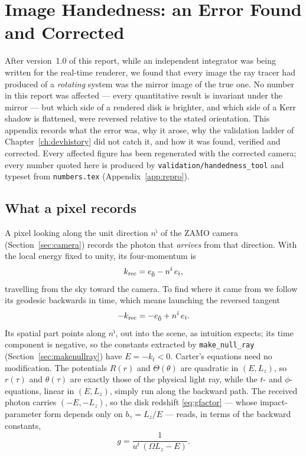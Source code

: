 \chapter{Image Handedness: an Error Found and Corrected}
\label{app:handedness}

After version~1.0 of this report, while an independent integrator was
being written for the real-time renderer, we found that every image the
ray tracer had produced of a \emph{rotating} system was the mirror image
of the true one. No number in this report was affected — every
quantitative result is invariant under the mirror — but which side of a
rendered disk is brighter, and which side of a Kerr shadow is flattened,
were reversed relative to the stated orientation. This appendix records
what the error was, why it arose, why the validation ladder of
Chapter~\ref{ch:devhistory} did not catch it, and how it was found,
verified and corrected. Every affected figure has been regenerated with
the corrected camera; every number quoted here is produced by
\texttt{validation/handedness\_tool} and typeset from
\texttt{numbers.tex} (Appendix~\ref{app:repro}).

\section{What a pixel records}
\label{sec:hand-pixel}

A pixel looking along the unit direction $n^{\hat\imath}$ of the ZAMO
camera (Section~\ref{sec:camera}) records the photon that \emph{arrives}
from that direction. With the local energy fixed to unity, its
four-momentum is
\begin{equation}
k_{\rm rec} = e_{\hat 0} - n^{\hat\imath}\, e_{\hat\imath},
\label{eq:krec}
\end{equation}
travelling from the sky toward the camera. To find where it came from we
follow its geodesic backwards in time, which means launching the
reversed tangent
\begin{equation}
-k_{\rm rec} = -e_{\hat 0} + n^{\hat\imath}\, e_{\hat\imath}.
\label{eq:kback}
\end{equation}
Its spatial part points along $n^{\hat\imath}$, out into the scene, as
intuition expects; its time component is negative, so the constants
extracted by \texttt{make\_null\_ray} (Section~\ref{sec:makenullray})
have $E = -k_t < 0$. Carter's equations need no modification. The
potentials $R(r)$ and $\Theta(\theta)$ are quadratic in $(E, L_z)$, so
$r(\tau)$ and $\theta(\tau)$ are exactly those of the physical light ray,
while the $t$- and $\phi$-equations, linear in $(E, L_z)$, simply run
along the backward path. The received photon carries $(-E, -L_z)$, so
the disk redshift \eqref{eq:gfactor} — whose impact-parameter form
depends only on $b_\gamma = L_z/E$ — reads, in terms of the backward
constants,
\begin{equation}
g = \frac{1}{u^t\,(\Omega L_z - E)} .
\label{eq:gback}
\end{equation}

